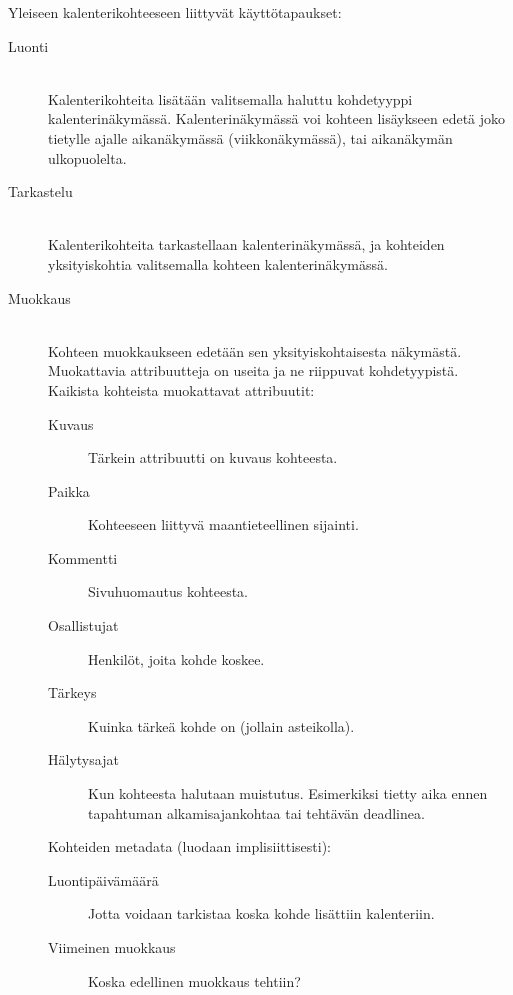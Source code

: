 \documentclass[a4paper,12pt]{report}
\begin{document}
Yleiseen kalenterikohteeseen liittyvät käyttötapaukset:
\begin{description}
   \item[Luonti]\hfill\\
      Kalenterikohteita lisätään valitsemalla haluttu kohdetyyppi
      kalenteri\-näky\-mäs\-sä. Kalenterinäkymässä voi kohteen lisäykseen edetä joko
      tietylle ajalle aikanäkymässä (viikkonäkymässä), tai aikanäkymän
      ulkopuolelta.

   \item[Tarkastelu]\hfill\\
      Kalenterikohteita tarkastellaan kalenterinäkymässä, ja kohteiden
      yksityiskohtia valitsemalla kohteen kalenterinäkymässä.

   \item[Muokkaus]\hfill\\
      Kohteen muokkaukseen edetään sen yksityiskohtaisesta näkymästä.
      Muokattavia attribuutteja on useita ja ne riippuvat kohdetyypistä.
      Kaikista kohteista muokattavat attribuutit:
      \begin{description}
         \item[Kuvaus]  Tärkein attribuutti on kuvaus kohteesta.
         \item[Paikka]  Kohteeseen liittyvä maantieteellinen sijainti.
         \item[Kommentti]  Sivuhuomautus kohteesta.
         \item[Osallistujat] Henkilöt, joita kohde koskee.
         \item[Tärkeys]  Kuinka tärkeä kohde on (jollain asteikolla).
         \item[Hälytysajat]  Kun kohteesta halutaan muistutus. Esimerkiksi
            tietty aika ennen tapahtuman alkamisajankohtaa tai tehtävän
            deadlinea.
      \end{description}

      Kohteiden metadata (luodaan implisiittisesti):
      \begin{description}
         \item[Luontipäivämäärä]  Jotta voidaan tarkistaa koska kohde lisättiin
            kalenteriin.
         \item[Viimeinen muokkaus]  Koska edellinen muokkaus tehtiin?
      \end{description}


\end{description}
\end{document}

